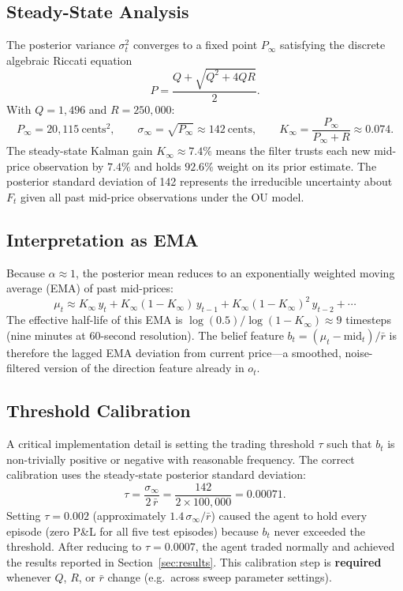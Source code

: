 \documentclass[11pt]{article}
\begin{document}
\subsection{Steady-State Analysis}

The posterior variance $\sigma^2_t$ converges to a fixed point $P_\infty$
satisfying the discrete algebraic Riccati equation
\[
P = \frac{Q + \sqrt{Q^2 + 4QR}}{2}.
\]
With $Q = 1{,}496$ and $R = 250{,}000$:
\[
P_\infty = 20{,}115\ \text{cents}^2,
\qquad
\sigma_\infty = \sqrt{P_\infty} \approx 142\ \text{cents},
\qquad
K_\infty = \frac{P_\infty}{P_\infty + R} \approx 0.074.
\]
The steady-state Kalman gain $K_\infty \approx 7.4\%$ means the filter trusts
each new mid-price observation by $7.4\%$ and holds $92.6\%$ weight on its
prior estimate.
The posterior standard deviation of 142\textcent{} represents the irreducible
uncertainty about $F_t$ given all past mid-price observations under the OU model.

\subsection{Interpretation as EMA}

Because $\alpha \approx 1$, the posterior mean reduces to an exponentially
weighted moving average (EMA) of past mid-prices:
\[
\mu_t \approx K_\infty\,y_t
            + K_\infty(1-K_\infty)\,y_{t-1}
            + K_\infty(1-K_\infty)^2\,y_{t-2} + \cdots
\]
The effective half-life of this EMA is $\log(0.5)/\log(1-K_\infty) \approx 9$
timesteps (nine minutes at 60-second resolution).
The belief feature $b_t = (\mu_t - \text{mid}_t)/\bar{r}$ is therefore the
lagged EMA deviation from current price---a smoothed, noise-filtered version
of the direction feature already in $o_t$.

\subsection{Threshold Calibration}

A critical implementation detail is setting the trading threshold $\tau$ such
that $b_t$ is non-trivially positive or negative with reasonable frequency.
The correct calibration uses the steady-state posterior standard deviation:
\[
\tau = \frac{\sigma_\infty}{2\,\bar{r}} = \frac{142}{2 \times 100{,}000} = 0.00071.
\]
Setting $\tau = 0.002$ (approximately $1.4\,\sigma_\infty/\bar{r}$) caused the
agent to hold every episode (zero P\&L for all five test episodes) because
$b_t$ never exceeded the threshold.
After reducing to $\tau = 0.0007$, the agent traded normally and achieved
the results reported in Section~\ref{sec:results}.
This calibration step is \textbf{required} whenever $Q$, $R$, or $\bar{r}$
change (e.g.\ across sweep parameter settings).
\end{document}
